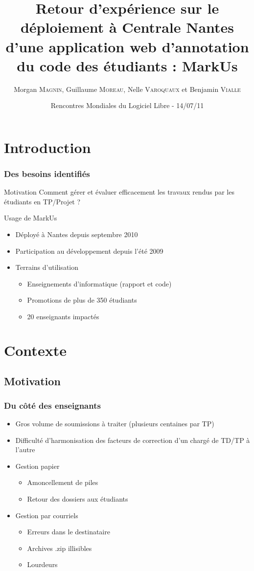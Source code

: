 \documentclass[hyperref,french,usenames,xcolor=dvipsnames]{beamer}
\title[REX MarkUs]%
{Retour d’expérience sur le déploiement à Centrale Nantes d’une application web d’annotation du code des étudiants : MarkUs}
\author[M. \textsc{Magnin}, G. \textsc{Moreau}, N. \textsc{Varoquaux}, B. \textsc{Vialle}]%
{Morgan \textsc{Magnin}, Guillaume \textsc{Moreau}, Nelle \textsc{Varoquaux} et Benjamin \textsc{Vialle}
}
\institute[ECN]{
\structure{
École Centrale de Nantes}
}
\date[14/07/2011]{Rencontres Mondiales du Logiciel Libre - 14/07/11}
\begin{document}
\frame{\titlepage}


\section*{Introduction}

\frame
{
  \frametitle{Des besoins identifiés}

\begin{alertblock}{Motivation}
Comment gérer et évaluer efficacement les travaux rendus par les étudiants en TP/Projet ?
\end{alertblock}

\begin{block}{Usage de MarkUs}
\begin{itemize}
\item Déployé à Nantes depuis septembre 2010
\item Participation au développement depuis l'été 2009
\item Terrains d'utilisation
\begin{itemize}
\item Enseignements d'informatique (rapport et code)
\item Promotions de plus de 350 étudiants
\item 20 enseignants impactés
\end{itemize}
\end{itemize}
\end{block}
}

\section*{Contexte}

\subsection*{Motivation}

\frame
{
  \frametitle{Du côté des enseignants}

\begin{itemize}
\item Gros volume de soumissions à traiter (plusieurs centaines par TP)
\item Difficulté d'harmonisation des facteurs de correction d'un chargé de TD/TP à l'autre
\item Gestion papier
\begin{itemize}
\item Amoncellement de piles
\item Retour des dossiers aux étudiants
\end{itemize}
\item Gestion par courriels
\begin{itemize}
\item Erreurs dans le destinataire
\item Archives .zip illisibles
\item Lourdeurs
\end{itemize}
\end{itemize}
}
\end{document}
